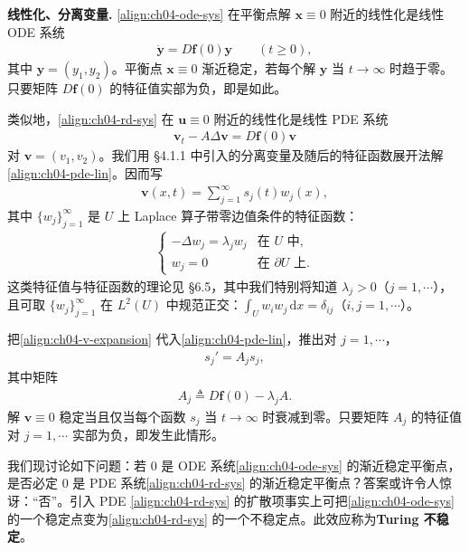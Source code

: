 \documentclass[../../main.tex]{subfiles}
\begin{document}
\textbf{线性化、分离变量.} \eqref{align:ch04-ode-sys} 在平衡点解 $\mathbf{x}\equiv 0$ 附近的线性化是线性 ODE 系统
\begin{align}\label{align:ch04-ode-lin}
\dot{\mathbf{y}}=D\mathbf{f}(0)\mathbf{y} \qquad(t\geqslant 0),
\end{align}
其中 $\mathbf{y}=(y_1,y_2)$。平衡点 $\mathbf{x}\equiv 0$ 渐近稳定，若每个解 $\mathbf{y}$ 当 $t\to\infty$ 时趋于零。只要矩阵 $D\mathbf{f}(0)$ 的特征值实部为负，即是如此。

类似地，\eqref{align:ch04-rd-sys} 在 $\mathbf{u}\equiv 0$ 附近的线性化是线性 PDE 系统
\begin{align}\label{align:ch04-pde-lin}
\mathbf{v}_t-A\Delta\mathbf{v}=D\mathbf{f}(0)\mathbf{v}
\end{align}
对 $\mathbf{v}=(v_1,v_2)$。我们用 \S4.1.1 中引入的分离变量及随后的特征函数展开法解\eqref{align:ch04-pde-lin}。因而写
\begin{align}\label{align:ch04-v-expansion}
\mathbf{v}(x,t)=\sum_{j=1}^\infty s_j(t)w_j(x),
\end{align}
其中 $\{w_j\}_{j=1}^\infty$ 是 $U$ 上 Laplace 算子带零边值条件的特征函数：
\begin{align*}
\begin{cases}
-\Delta w_j=\lambda_j w_j & \text{在 }U\text{ 中},\\
w_j=0 & \text{在 }\partial U\text{ 上}.
\end{cases}
\end{align*}
这类特征值与特征函数的理论见 \S6.5，其中我们特别将知道 $\lambda_j>0$（$j=1,\cdots$），且可取 $\{w_j\}_{j=1}^\infty$ 在 $L^2(U)$ 中规范正交：$\int_U w_iw_j\,\mathrm{d}x=\delta_{ij}$（$i,j=1,\cdots$）。

把\eqref{align:ch04-v-expansion} 代入\eqref{align:ch04-pde-lin}，推出对 $j=1,\cdots$，
\begin{align}\label{align:ch04-sj-ode}
s_j'=A_j s_j,
\end{align}
其中矩阵
\begin{align}\label{align:ch04-Aj}
A_j\triangleq D\mathbf{f}(0)-\lambda_j A.
\end{align}
解 $\mathbf{v}\equiv 0$ 稳定当且仅当每个函数 $s_j$ 当 $t\to\infty$ 时衰减到零。只要矩阵 $A_j$ 的特征值对 $j=1,\cdots$ 实部为负，即发生此情形。

我们现讨论如下问题：若 $0$ 是 ODE 系统\eqref{align:ch04-ode-sys} 的渐近稳定平衡点，是否必定 $0$ 是 PDE 系统\eqref{align:ch04-rd-sys} 的渐近稳定平衡点？答案或许令人惊讶：``否''。引入 PDE \eqref{align:ch04-rd-sys} 的扩散项事实上可把\eqref{align:ch04-ode-sys} 的一个稳定点变为\eqref{align:ch04-rd-sys} 的一个不稳定点。此效应称为\textbf{Turing 不稳定}。
\end{document}
